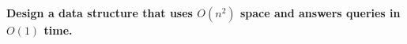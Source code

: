 \textbf{Design a data structure that uses $O(n^2)$ space and answers queries in $O(1)$ time.}\vspace{.2cm}

\textcolor{bibi}{}
\begin{quote}
\end{quote}